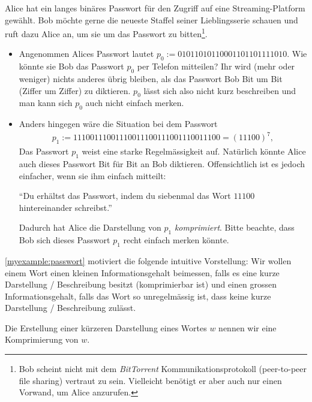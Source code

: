 \begin{myexample}\label{myexample:passwort}
Alice hat ein langes binäres Passwort für den Zugriff auf eine Streaming-Platform gewählt.
Bob möchte gerne die neueste Staffel seiner Lieblingsserie schauen und ruft dazu Alice an, um sie um das Passwort zu bitten\footnote{Bob scheint nicht mit dem \textit{BitTorrent} Kommunikationsprotokoll (peer-to-peer file sharing) vertraut zu sein.
	Vielleicht benötigt er aber auch nur einen Vorwand, um Alice anzurufen.}.

\begin{itemize}
	\item Angenommen Alices Passwort lautet $p_0 := 01011010110001101101111010$. Wie könnte sie Bob das Passwort $p_0$ per Telefon mitteilen? Ihr wird (mehr oder weniger) nichts anderes übrig bleiben, als das Passwort Bob Bit um Bit (Ziffer um Ziffer) zu diktieren. $p_0$ lässt sich also nicht kurz beschreiben und man kann sich $p_0$ auch nicht einfach merken.
	\item Anders hingegen wäre die Situation bei dem Passwort
	      \begin{align*}
		      p_1 := 11100111001110011100111001110011100 = (11100)^7,
	      \end{align*}
	      Das Passwort $p_1$ weist eine starke Regelmässigkeit auf. Natürlich könnte Alice auch dieses Passwort Bit für Bit an Bob diktieren. Offensichtlich ist es jedoch einfacher, wenn sie ihm einfach mitteilt:
	      \begin{center}
		      \enquote{Du erhältst das Passwort, indem du siebenmal das Wort $11100$ hintereinander schreibst.}
	      \end{center}
	      Dadurch hat Alice die Darstellung von $p_1$ \textit{komprimiert}. Bitte beachte, dass Bob sich dieses Passwort $p_1$ recht einfach merken könnte.
\end{itemize}
\end{myexample}

\cref{myexample:passwort} motiviert die folgende intuitive Vorstellung: Wir wollen einem Wort einen kleinen Informationsgehalt beimessen, falls es eine kurze Darstellung / Beschreibung besitzt (komprimierbar ist) und
einen grossen Informationsgehalt, falls das Wort so unregelmässig ist, dass keine kurze Darstellung / Beschreibung zulässt.

\begin{mydefinition}\label{mydefinition:Komprimierung}
Die Erstellung einer kürzeren Darstellung eines Wortes $w$ nennen wir eine
Komprimierung von $w$.
\end{mydefinition}


